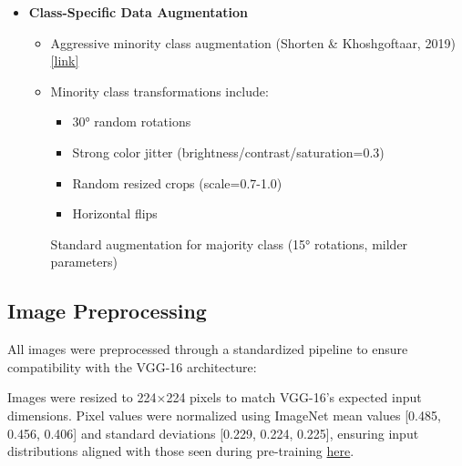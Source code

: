 \documentclass[a4paper,12pt]{article}
\begin{document}
\begin{itemize}
    \item \textbf{Class-Specific Data Augmentation}
    \begin{itemize}
        \item Aggressive minority class augmentation (Shorten \& Khoshgoftaar, 2019) \href{https://journalofbigdata.springeropen.com/articles/10.1186/s40537-019-0197-0}{[link]}
        \item Minority class transformations include:
        \begin{itemize}
            \item 30° random rotations
            \item Strong color jitter (brightness/contrast/saturation=0.3)
            \item Random resized crops (scale=0.7-1.0)
            \item Horizontal flips
        \end{itemize}
        \subitem Standard augmentation for majority class (15° rotations, milder parameters)
    \end{itemize}
\end{itemize}

\subsection{Image Preprocessing}
All images were preprocessed through a standardized pipeline to ensure compatibility with the VGG-16 architecture:


Images were resized to 224×224 pixels to match VGG-16's expected input dimensions. Pixel values were normalized using ImageNet mean values [0.485, 0.456, 0.406] and standard deviations [0.229, 0.224, 0.225], ensuring input distributions aligned with those seen during pre-training \href{https://openaccess.thecvf.com/content_cvpr_2016/papers/He_Deep_Residual_Learning_CVPR_2016_paper.pdf}{here}.
\end{document}
